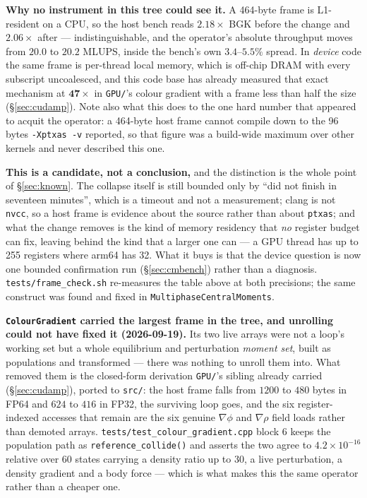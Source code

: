 \documentclass[11pt,a4paper]{article}
\newcommand{\code}[1]{\texttt{\small #1}}
\newcommand{\e}[1]{\times 10^{#1}}
\begin{document}
\textbf{Why no instrument in this tree could see it.} A 464-byte frame is
L1-resident on a CPU, so the host bench reads $2.18\times$ BGK before the change
and $2.06\times$ after --- indistinguishable, and the operator's absolute
throughput moves from $20.0$ to $20.2$ MLUPS, inside the bench's own $3.4$--$5.5\%$
spread. In \emph{device} code the same frame is per-thread local memory, which
is off-chip DRAM with every subscript uncoalesced, and this code base has
already measured that exact mechanism at $\mathbf{47\times}$ in \code{GPU/}'s
colour gradient with a frame less than half the size
(\S\ref{sec:cudamp}). Note also what this does to the one hard number that
appeared to acquit the operator: a 464-byte host frame cannot compile down to
the 96 bytes \code{-Xptxas -v} reported, so that figure was a build-wide maximum
over other kernels and never described this one.

\textbf{This is a candidate, not a conclusion,} and the distinction is the whole
point of \S\ref{sec:known}. The collapse itself is still bounded only by ``did
not finish in seventeen minutes'', which is a timeout and not a measurement;
clang is not \code{nvcc}, so a host frame is evidence about the source rather
than about \code{ptxas}; and what the change removes is the kind of memory
residency that \emph{no} register budget can fix, leaving behind the kind that a
larger one can --- a GPU thread has up to 255 registers where arm64 has 32. What
it buys is that the device question is now one bounded confirmation run
(\S\ref{sec:cmbench}) rather than a diagnosis. \code{tests/frame\_check.sh}
re-measures the table above at both precisions; the same construct was found and
fixed in \code{MultiphaseCentralMoments}.

\textbf{\code{ColourGradient} carried the largest frame in the tree, and
unrolling could not have fixed it (2026-09-19).}\label{sec:cmframe} Its two
live arrays were not a
loop's working set but a whole equilibrium and perturbation \emph{moment set},
built as populations and transformed --- there was nothing to unroll them into.
What removed them is the closed-form derivation \code{GPU/}'s sibling already
carried (\S\ref{sec:cudamp}), ported to \code{src/}: the host frame falls from
$1200$ to $480$ bytes in FP64 and $624$ to $416$ in FP32, the surviving loop
goes, and the six register-indexed accesses that remain are the six genuine
$\nabla\phi$ and $\nabla\rho$ field loads rather than demoted arrays.
\code{tests/test\_colour\_gradient.cpp} block 6 keeps the population path as
\code{reference\_collide()} and asserts the two agree to $4.2\e{-16}$ relative
over 60 states carrying a density ratio up to 30, a live perturbation, a density
gradient and a body force --- which is what makes this the same operator rather
than a cheaper one.
\end{document}
